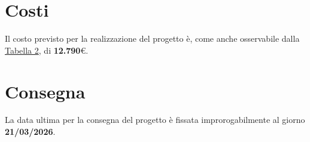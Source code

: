 \documentclass[a4paper,11pt]{article}
\begin{document}
\newpage

\section{Costi}
Il costo previsto per la realizzazione del progetto è, come anche osservabile dalla \hyperref[tab:costi-ruoli]{\textcolor{secondaryblue}{Tabella 2}}, di \textbf{12.790}\euro.

\section{Consegna}
La data ultima per la consegna del progetto è fissata improrogabilmente al giorno \textbf{21/03/2026}.
\end{document}
